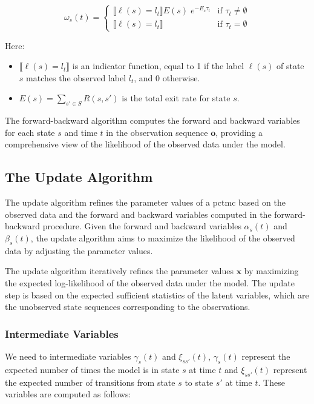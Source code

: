 \begin{equation}
    \omega_s(t) =
    \begin{cases}
        \lBrack \ell(s) = l_t \rBrack E(s) \; e^{-E_s\tau_t} & \text{if } \tau_t \neq \emptyset \\
        \lBrack \ell(s) = l_t \rBrack & \text{if } \tau_t = \emptyset
    \end{cases}
    \label{eq:omega-pctmc}
\end{equation}


Here:


\begin{itemize}
    \item $\lBrack \ell(s) = l_t \rBrack$ is an indicator function, equal to 1 if the label $\ell(s)$ of state $s$ matches the observed label $l_t$, and 0 otherwise.
    \item $E(s) = \sum_{s' \in S} R(s, s')$ is the total exit rate for state $s$.
\end{itemize}


The forward-backward algorithm computes the forward and backward variables for each state $s$ and time $t$ in the observation sequence $\mathbf{o}$, providing a comprehensive view of the likelihood of the observed data under the model.

\subsection{The Update Algorithm}\label{subsec:update-algorithm}
The update algorithm refines the parameter values of a \gls{pctmc} based on the observed data and the forward and backward variables computed in the forward-backward procedure.
Given the forward and backward variables $\alpha_s(t)$ and $\beta_s(t)$, the update algorithm aims to maximize the likelihood of the observed data by adjusting the parameter values.

The update algorithm iteratively refines the parameter values $\mathbf{x}$ by maximizing the expected log-likelihood of the observed data under the model.
The update step is based on the expected sufficient statistics of the latent variables, which are the unobserved state sequences corresponding to the observations.

\subsubsection{Intermediate Variables}
We need to intermediate variables $\gamma_s(t)$ and $\xi_{ss'}(t)$, $\gamma_s(t)$ represent the expected number of times the model is in state $s$ at time $t$ and $\xi_{ss'}(t)$ represent the expected number of transitions from state $s$ to state $s'$ at time $t$.
These variables are computed as follows:


